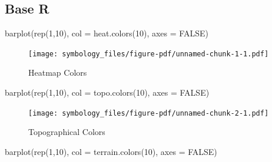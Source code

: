 \documentclass[
  letterpaper,
  DIV=11,
  numbers=noendperiod,
  oneside]{scrreprt}
\newenvironment{Shaded}{\begin{snugshade}}{\end{snugshade}}
\newcommand{\AttributeTok}[1]{\textcolor[rgb]{0.40,0.45,0.13}{#1}}
\newcommand{\ConstantTok}[1]{\textcolor[rgb]{0.56,0.35,0.01}{#1}}
\newcommand{\DecValTok}[1]{\textcolor[rgb]{0.68,0.00,0.00}{#1}}
\newcommand{\FunctionTok}[1]{\textcolor[rgb]{0.28,0.35,0.67}{#1}}
\newcommand{\NormalTok}[1]{\textcolor[rgb]{0.00,0.23,0.31}{#1}}
\begin{document}
\subsection{Base R}\label{base-r}

\begin{Shaded}
\begin{Highlighting}[]
\FunctionTok{barplot}\NormalTok{(}\FunctionTok{rep}\NormalTok{(}\DecValTok{1}\NormalTok{,}\DecValTok{10}\NormalTok{), }\AttributeTok{col =} \FunctionTok{heat.colors}\NormalTok{(}\DecValTok{10}\NormalTok{), }\AttributeTok{axes =} \ConstantTok{FALSE}\NormalTok{)}
\end{Highlighting}
\end{Shaded}

\begin{figure}[H]

{\centering \texttt{[image: symbology\_files/figure-pdf/unnamed-chunk-1-1.pdf]}

}

\caption{Heatmap Colors}

\end{figure}%

\begin{Shaded}
\begin{Highlighting}[]
\FunctionTok{barplot}\NormalTok{(}\FunctionTok{rep}\NormalTok{(}\DecValTok{1}\NormalTok{,}\DecValTok{10}\NormalTok{), }\AttributeTok{col =} \FunctionTok{topo.colors}\NormalTok{(}\DecValTok{10}\NormalTok{), }\AttributeTok{axes =} \ConstantTok{FALSE}\NormalTok{)}
\end{Highlighting}
\end{Shaded}

\begin{figure}[H]

{\centering \texttt{[image: symbology\_files/figure-pdf/unnamed-chunk-2-1.pdf]}

}

\caption{Topographical Colors}

\end{figure}%

\begin{Shaded}
\begin{Highlighting}[]
\FunctionTok{barplot}\NormalTok{(}\FunctionTok{rep}\NormalTok{(}\DecValTok{1}\NormalTok{,}\DecValTok{10}\NormalTok{), }\AttributeTok{col =} \FunctionTok{terrain.colors}\NormalTok{(}\DecValTok{10}\NormalTok{), }\AttributeTok{axes =} \ConstantTok{FALSE}\NormalTok{)}
\end{Highlighting}
\end{Shaded}
\end{document}
